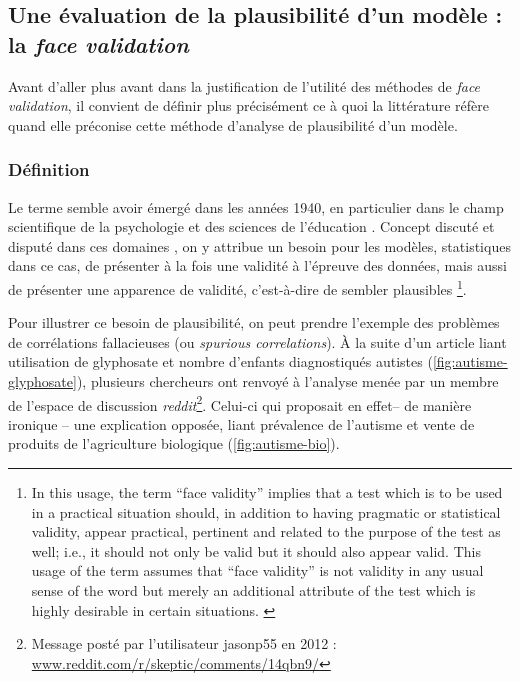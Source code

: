 \subsection{Une évaluation de la plausibilité d'un modèle : la \og \textit{face validation}\fg{}}\label{subsec:face-validity}

Avant d'aller plus avant dans la justification de l'utilité des méthodes de \textit{face validation}, il convient de définir plus précisément ce à quoi la littérature réfère quand elle préconise cette méthode d'analyse de plausibilité d'un modèle.

\subsubsection{Définition}
Le terme semble avoir émergé dans les années 1940, en particulier dans le champ scientifique de la psychologie et des sciences de l'éducation \autocite{nevo_face_1985}.
Concept discuté et disputé dans ces domaines \autocite{mosier_critical_1947}, on y attribue un besoin pour les modèles, statistiques dans ce cas, de présenter à la fois une validité à l'épreuve des données, mais aussi de présenter une apparence de validité, c'est-à-dire de sembler plausibles
\footnote{
	\og
	In this usage, the term ``face validity'' implies that a test which is to be used in a practical situation should, in addition to having pragmatic or statistical validity, appear practical, pertinent and related to the purpose of the test as well; i.e., it should not only be valid but it should also appear valid.
	This usage of the term assumes that ``face validity'' is not validity in any usual sense of the word but merely an additional attribute of the test which is highly desirable in certain situations.
	\fg{} \textcite[192]{mosier_critical_1947}
}.

Pour illustrer ce besoin de \og plausibilité\fg{}, on peut prendre l'exemple des problèmes de corrélations fallacieuses (ou \og \textit{spurious correlations}\fg{}).
À la suite d'un article \autocite{shaw_elevated_2017} liant utilisation de glyphosate et nombre d'enfants diagnostiqués autistes (\cref{fig:autisme-glyphosate}), plusieurs chercheurs ont renvoyé à l'analyse menée par un membre de l'espace de discussion \textit{reddit}\footnote{
	Message posté par l'utilisateur \og jasonp55\fg{} en 2012 : \\ \href{https://web.archive.org/web/20130105045416/https://www.reddit.com/r/skeptic/comments/14qbn9/rskeptic_i_was_practicing_graphpad_and_i_think_i/}{www.reddit.com/r/skeptic/comments/14qbn9/}
}.
Celui-ci qui proposait en effet-- de manière ironique -- une explication opposée, liant prévalence de l'autisme et vente de produits de  l'agriculture biologique (\cref{fig:autisme-bio}).

